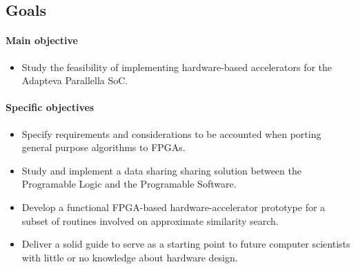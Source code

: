 \subsection{Goals}
\paragraph{Main objective}
\begin{itemize}
\item Study the feasibility of implementing hardware-based accelerators for the Adapteva Parallella SoC.
\end{itemize}

\paragraph{Specific objectives}
\begin{itemize}
    \item Specify requirements and considerations to be accounted when porting general purpose algorithms to FPGAs.
    \item Study and implement a data sharing sharing solution between the Programable Logic and the Programable Software.
    \item Develop a functional FPGA-based hardware-accelerator prototype for a subset of routines involved 
    on approximate similarity search.
    \item Deliver a solid guide to serve as a starting point to future computer scientists with little or no 
    knowledge about hardware design. 
\end{itemize}